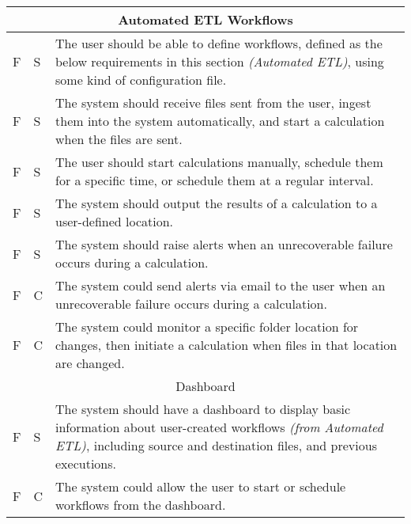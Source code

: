 \documentclass[12pt]{article}
\begin{document}
\begin{longtable}{ |p{}|p{}|p{}|}
		\multicolumn{3}{|c|}{Automated ETL Workflows} \\ \hline
		F & S & The user should be able to define workflows, defined as the below requirements in this section \textit{(Automated ETL)}, using some kind of configuration file. \\ \hline
		F & S & The system should receive files sent from the user, ingest them into the system automatically, and start a calculation when the files are sent. \\ \hline
		F & S & The user should start calculations manually, schedule them for a specific time, or schedule them at a regular interval. \\ \hline
		F & S & The system should output the results of a calculation to a user-defined location. \\ \hline
		F & S & The system should raise alerts when an unrecoverable failure occurs during a calculation. \\ \hline
		F & C & The system could send alerts via email to the user when an unrecoverable failure occurs during a calculation. \\ \hline
		F & C & The system could monitor a specific folder location for changes, then initiate a calculation when files in that location are changed. \\ \hline
		\multicolumn{3}{|c|}{Dashboard} \\ \hline
		F & S & The system should have a dashboard to display basic information about user-created workflows \textit{(from Automated ETL)}, including source and destination files, and previous executions. \\ \hline
		F & C & The system could allow the user to start or schedule workflows from the dashboard. \\
		\hline
	\end{longtable}
\end{document}
